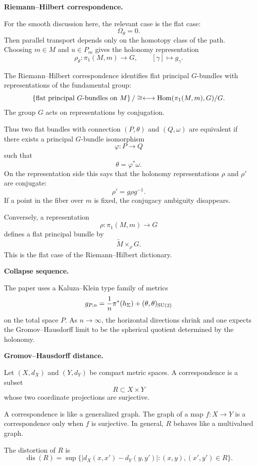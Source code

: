 \medskip\noindent
{\bf Riemann--Hilbert correspondence.}

For the smooth discussion here, the
relevant case is the flat case:
$$
        \Omega_\theta=0.
$$
Then parallel transport depends only on
the homotopy class of the path.
Choosing $m\in M$ and $u\in P_m$ gives
the holonomy representation
$$
        \rho_\theta:\pi_1(M,m)\to G,
        \qquad
        [\gamma]\mapsto g_\gamma .
$$

The Riemann--Hilbert correspondence
identifies flat principal $G$-bundles
with representations of the
fundamental group:
$$
        \left\{
        \hbox{flat principal }G
        \hbox{-bundles on }M
        \right\}/\cong
        \longleftrightarrow
        \operatorname{Hom}(\pi_1(M,m),G)/G .
$$
The group $G$ acts on representations
by conjugation.

Thus two flat bundles with connection
$(P,\theta)$ and $(Q,\omega)$ are
equivalent if there exists a principal
$G$-bundle isomorphism
$$
        \varphi:P\to Q
$$
such that
$$
        \theta=\varphi^*\omega .
$$
On the representation side this says
that the holonomy representations
$\rho$ and $\rho'$ are conjugate:
$$
        \rho'=g\rho g^{-1}.
$$
If a point in the fiber over $m$ is
fixed, the conjugacy ambiguity
disappears.

Conversely, a representation
$$
        \rho:\pi_1(M,m)\to G
$$
defines a flat principal bundle by
$$
        \widetilde M\times_\rho G .
$$
This is the flat case of the
Riemann--Hilbert dictionary.

\medskip\noindent
{\bf Collapse sequence.}

The paper uses a Kaluza--Klein type
family of metrics
$$
        g_{P,n}
        =
        {1\over n}\pi^*(h_\Sigma)
        +
        (\theta,\theta)_{
        \operatorname{SU}(2)}
$$
on the total space $P$.
As $n\to\infty$, the horizontal
directions shrink and one expects the
Gromov--Hausdorff limit to be the
spherical quotient determined by the
holonomy.

\medskip\noindent
{\bf Gromov--Hausdorff distance.}

Let $(X,d_X)$ and $(Y,d_Y)$ be compact
metric spaces.
A correspondence is a subset
$$
        R\subset X\times Y
$$
whose two coordinate projections are
surjective.

A correspondence is like a generalized
graph.
The graph of a map $f:X\to Y$ is a
correspondence only when $f$ is
surjective.
In general, $R$ behaves like a
multivalued graph.

The distortion of $R$ is
$$
        \operatorname{dis}(R)
        =
        \sup\{
        |d_X(x,x')-d_Y(y,y')|:
        (x,y),(x',y')\in R
        \}.
$$

